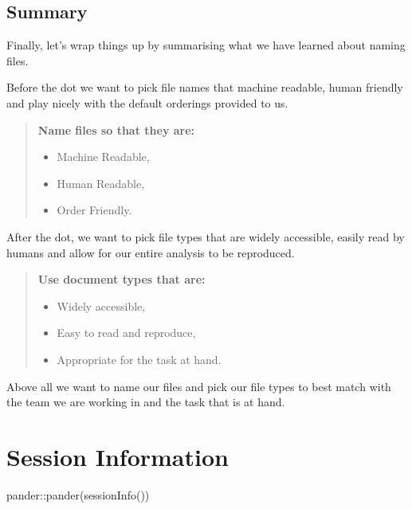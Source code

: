 \documentclass[
  letterpaper,
  DIV=11,
  numbers=noendperiod]{scrreprt}
\newenvironment{Shaded}{\begin{snugshade}}{\end{snugshade}}
\newcommand{\FunctionTok}[1]{\textcolor[rgb]{0.28,0.35,0.67}{#1}}
\newcommand{\NormalTok}[1]{\textcolor[rgb]{0.00,0.23,0.31}{#1}}
\newcommand{\SpecialCharTok}[1]{\textcolor[rgb]{0.37,0.37,0.37}{#1}}
\providecommand{\tightlist}{%
  \setlength{\itemsep}{0pt}\setlength{\parskip}{0pt}}\usepackage{longtable,booktabs,array}
\begin{document}
\subsection{Summary}\label{summary}

Finally, let's wrap things up by summarising what we have learned about
naming files.

Before the dot we want to pick file names that machine readable, human
friendly and play nicely with the default orderings provided to us.

\begin{quote}
\textbf{Name files so that they are:}

\begin{itemize}
\tightlist
\item
  Machine Readable,
\item
  Human Readable,
\item
  Order Friendly.
\end{itemize}
\end{quote}

After the dot, we want to pick file types that are widely accessible,
easily read by humans and allow for our entire analysis to be
reproduced.

\begin{quote}
\textbf{Use document types that are:}

\begin{itemize}
\tightlist
\item
  Widely accessible,
\item
  Easy to read and reproduce,
\item
  Appropriate for the task at hand.
\end{itemize}
\end{quote}

Above all we want to name our files and pick our file types to best
match with the team we are working in and the task that is at hand.

\section{Session Information}\label{session-information-1}

\begin{Shaded}
\begin{Highlighting}[]
\NormalTok{pander}\SpecialCharTok{::}\FunctionTok{pander}\NormalTok{(}\FunctionTok{sessionInfo}\NormalTok{())}
\end{Highlighting}
\end{Shaded}
\end{document}

